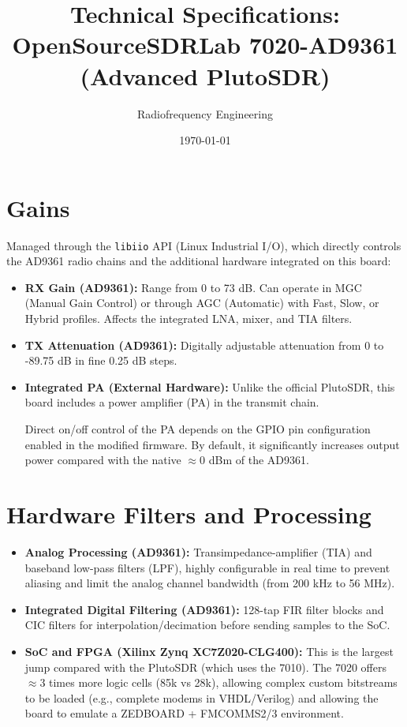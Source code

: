 \documentclass[11pt]{article}
\title{Technical Specifications: OpenSourceSDRLab 7020-AD9361 (Advanced PlutoSDR)}
\author{Radiofrequency Engineering}
\date{\today}
\begin{document}
\maketitle
\tableofcontents
\newpage

\section{Gains}

Managed through the \texttt{libiio} API (Linux Industrial I/O), which directly controls the AD9361 radio chains and the additional hardware integrated on this board:

\begin{itemize}
    \item \textbf{RX Gain (AD9361):} Range from 0 to 73 dB. Can operate in MGC (Manual Gain Control) or through AGC (Automatic) with Fast, Slow, or Hybrid profiles. Affects the integrated LNA, mixer, and TIA filters.
    \item \textbf{TX Attenuation (AD9361):} Digitally adjustable attenuation from 0 to -89.75 dB in fine 0.25 dB steps.
    \item \textbf{Integrated PA (External Hardware):} Unlike the official PlutoSDR, this board includes a power amplifier (PA) in the transmit chain.
    \begin{pendingbox}
    Direct on/off control of the PA depends on the GPIO pin configuration enabled in the modified firmware. By default, it significantly increases output power compared with the native $\approx$0 dBm of the AD9361.
    \end{pendingbox}
\end{itemize}

\section{Hardware Filters and Processing}

\begin{itemize}
    \item \textbf{Analog Processing (AD9361):} Transimpedance-amplifier (TIA) and baseband low-pass filters (LPF), highly configurable in real time to prevent aliasing and limit the analog channel bandwidth (from 200 kHz to 56 MHz).
    \item \textbf{Integrated Digital Filtering (AD9361):} 128-tap FIR filter blocks and CIC filters for interpolation/decimation before sending samples to the SoC.
    \item \textbf{SoC and FPGA (Xilinx Zynq XC7Z020-CLG400):} This is the largest jump compared with the PlutoSDR (which uses the 7010). The 7020 offers $\approx$3 times more logic cells (85k vs 28k), allowing complex custom bitstreams to be loaded (e.g., complete modems in VHDL/Verilog) and allowing the board to emulate a ZEDBOARD + FMCOMMS2/3 environment.
\end{itemize}
\end{document}
